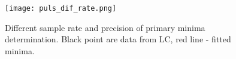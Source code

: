 \begin{figure}[!h]
    \centering
    \texttt{[image: puls\_dif\_rate.png]}
    \caption{Different sample rate and precision of primary minima determination. Black point are data from LC, red line - fitted minima.}
\label{fig:puls_dif_rate}
\end{figure}


